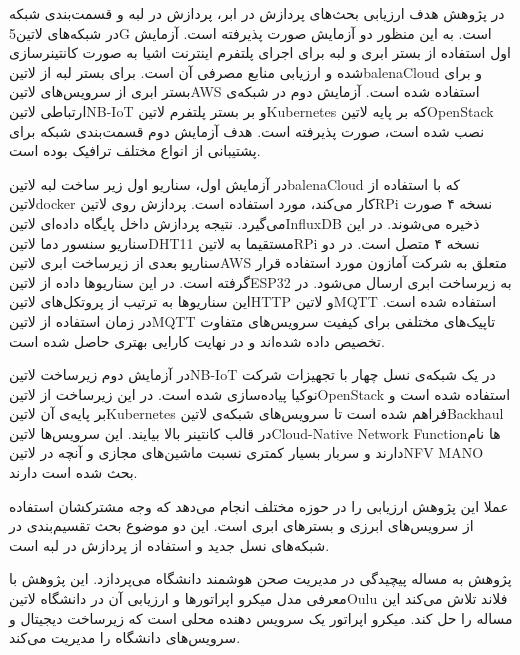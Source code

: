 
در پژوهش  هدف ارزیابی بحث‌های پردازش در ابر، پردازش در لبه و قسمت‌بندی شبکه در شبکه‌های ‌لاتین{5G} است.
به این منظور دو آزمایش صورت پذیرفته است. آزمایش اول استفاده از بستر ابری و لبه برای اجرای پلتفرم اینترنت اشیا
به صورت کانتینرسازی شده و ارزیابی منابع مصرفی آن است. برای بستر لبه از ‌لاتین{balenaCloud} و برای بستر ابری از سرویس‌های ‌لاتین{AWS}
استفاده شده است.
آزمایش دوم در شبکه‌ی ارتباطی ‌لاتین{NB-IoT} و بر بستر
پلتفرم ‌لاتین{Kubernetes} که بر پایه ‌لاتین{OpenStack} نصب شده است، صورت پذیرفته است.
هدف آزمایش دوم قسمت‌بندی شبکه برای پشتیبانی از انواع مختلف ترافیک بوده است.

در آزمایش اول، سناریو اول زیر ساخت لبه ‌لاتین{balenaCloud} که با استفاده از ‌لاتین{docker}
کار می‌کند، مورد استفاده است. پردازش روی ‌لاتین{RPi} نسخه ۴ صورت می‌گیرد. نتیجه پردازش داخل پایگاه داده‌ای
‌لاتین{InfluxDB} ذخیره می‌شوند. در این سناریو سنسور دما ‌لاتین{DHT11} مستقیما
به ‌لاتین{RPi} نسخه ۴ متصل است.
در دو سناریو بعدی از زیرساخت ابری ‌لاتین{AWS} متعلق به شرکت آمازون مورد استفاده قرار گرفته است.
در این سناریوها داده از ‌لاتین{ESP32} به زیرساخت ابری ارسال می‌شود. در این سناریوها به ترتیب
از پروتکل‌های ‌لاتین{HTTP} و ‌لاتین{MQTT} استفاده شده است.
در زمان استفاده از ‌لاتین{MQTT} تاپیک‌های مختلفی برای کیفیت سرویس‌های متفاوت تخصیص داده
شده‌اند و در نهایت کارایی بهتری حاصل شده است.

در آزمایش دوم زیرساخت ‌لاتین{NB-IoT} در یک شبکه‌ی نسل چهار با تجهیزات شرکت نوکیا پیاده‌سازی شده است.
در این زیرساخت از ‌لاتین{OpenStack} استفاده شده است و بر پایه‌ی آن ‌لاتین{Kubernetes} فراهم شده است
تا سرویس‌های شبکه‌ی ‌لاتین{Backhaul} در قالب کانتینر بالا بیایند.
این سرویس‌ها ‌لاتین{Cloud-Native Network Function}ها نام دارند و سربار بسیار کمتری نسبت ماشین‌های مجازی
و آنچه در ‌لاتین{NFV MANO} بحث شده است دارند.

عملا این پژوهش ارزیابی را در حوزه مختلف انجام می‌دهد که وجه مشترکشان استفاده از سرویس‌های ابرزی و بسترهای ابری است.
این دو موضوع بحث تقسیم‌بندی در شبکه‌های نسل جدید و استفاده از پردازش در لبه است.


پژوهش  به مساله پیچیدگی در مدیریت صحن هوشمند دانشگاه می‌پردازد. این پژوهش با معرفی مدل میکرو اپراتورها و ارزیابی آن در دانشگاه ‌لاتین{Oulu} فلاند تلاش می‌کند این مساله را حل کند.
میکرو اپراتور یک سرویس دهنده محلی است که زیرساخت دیجیتال و سرویس‌های دانشگاه را مدیریت می‌کند.

